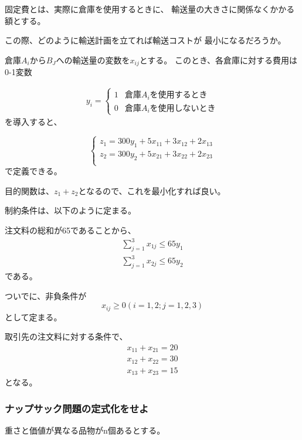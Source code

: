 \documentclass[9pt]{ltjsreport}
\begin{document}
固定費とは、実際に倉庫を使用するときに、
輸送量の大きさに関係なくかかる額とする。

この際、どのように輸送計画を立てれば輸送コストが
最小になるだろうか。

\hrulefill

倉庫$A_i$から$B_J$への輸送量の変数を$x_{ij}$とする。
このとき、各倉庫に対する費用は0-1変数

\begin{align}
    y_i=
    \begin{cases}
        1 & \text{倉庫$A_i$を使用するとき}\\
        0& \text{倉庫$A_i$を使用しないとき}
    \end{cases}
\end{align}
を導入すると、

\begin{equation}
    \begin{cases}
        z_1=300y_1+5x_{11}+3x_{12}+2x_{13}\\
        z_2=300y_2+5x_{21}+3x_{22}+2x_{23}\\
    \end{cases}
\end{equation}
で定義できる。

目的関数は、$z_1+z_2$となるので、これを最小化すれば良い。

制約条件は、以下のように定まる。

注文料の総和が65であることから、
\begin{gather}
    \sum^3_{j=1} x_{1j}\le 65y_1 \\
    \sum^3_{j=1} x_{2j}\le 65y_2
\end{gather}
である。

ついでに、非負条件が
\begin{equation}
    x_{ij}\ge0 (i=1,2;j=1,2,3)
\end{equation}
として定まる。

取引先の注文料に対する条件で、
\begin{gather}
    x_{11}+x_{21}=20\\
    x_{12}+x_{22}=30\\
    x_{13}+x_{23}=15
\end{gather}
となる。

\subsubsection{ナップサック問題の定式化をせよ}
重さと価値が異なる品物がn個あるとする。
\end{document}
